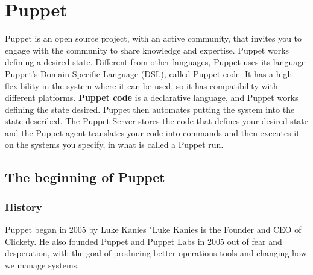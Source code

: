 \documentclass[12pt,a4paper,openright,twoside]{book}
\begin{document}


\chapter{Puppet}
Puppet is an open source project, with an active community, that invites you to engage with the community to share knowledge and expertise.
Puppet works defining a desired state. Different from other languages, Puppet uses its language Puppet's Domain-Specific Language (DSL), called Puppet code.
It has a high flexibility in the system where it can be used, so it has compatibility with different platforms.
\textbf{Puppet code} is a declarative language, and Puppet works defining the state desired. Puppet then automates putting the system into the state described.
The Puppet Server stores the code that defines your desired state and the Puppet agent translates your code into commands and then executes it on the systems you specify, in what is called a Puppet run.
\cite{puppetDocIndex}
\cite{puppetDocWhatIs}

%
%
\section{The beginning of Puppet}

\subsection{History}
Puppet began in 2005 by Luke Kanies
"Luke Kanies is the Founder and CEO of Clickety. He also founded Puppet and Puppet Labs in 2005 out of fear and desperation, with the goal of producing better operations tools and changing how we manage systems.
\end{document}
